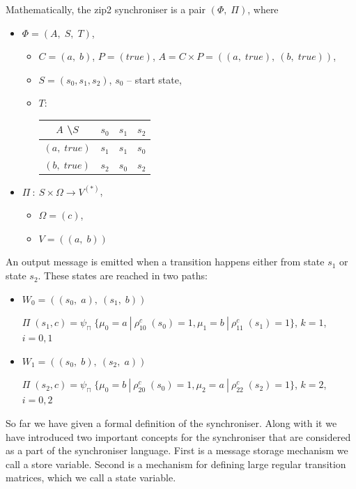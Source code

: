 \begin{enumerate}
Mathematically, the zip2 synchroniser is a pair $(\Phi, \; \Pi)$, where
  \begin{itemize}
  \item[] $\Phi = (A, \; S, \; T)$,
    \begin{itemize}
    \item[] $C = (a, \; b)$, $P = (true)$, $A = C \times P = ((a, \; true), \: (b, \; true))$,
    \item[] $S = (s_{0}, s_{1}, s_{2})$, $s_{0}$ -- start state,
    \item[] $T$:
      \begin{tabular}{c|c|c|c}
      $A$ \textbackslash $S$ & $s_{0}$ & $s_{1}$ & $s_{2}$\\
      \hline
      $(a, \; true)$ & $s_{1}$ & $s_{1}$ & $s_{0}$\\
      \hline
      $(b, \; true)$ & $s_{2}$ & $s_{0}$ & $s_{2}$\\
      \end{tabular}
    \end{itemize}
  \item[] $\Pi \: : \: S \times \Omega \to V^{(*)}$,
    \begin{itemize}
    \item[] $\Omega = (c)$,
    \item[] $V = ((a, \; b))$
    \end{itemize}
  \end{itemize}

An output message is emitted when a transition happens either from state $s_{1}$ or state $s_{2}$. These states are reached in two paths:
  \begin{itemize}
  \item[]
$W_{0} = ((s_{0}, \; a), \: (s_{1}, \; b))$

$\Pi \; (s_{1}, c) = \psi_{\sqcap} \; \{\mu_{0} = a \: | \: \rho_{10}^{c} \; (s_{0}) = 1, \mu_{1} = b \: | \: \rho_{11}^{c} \; (s_{1}) = 1\}$, $k = 1$, $i = 0,1$
  \item[]
$W_{1} = ((s_{0}, \; b), \: (s_{2}, \; a))$

$\Pi \; (s_{2}, c) = \psi_{\sqcap} \; \{\mu_{0} = b \: | \: \rho_{20}^{c} \; (s_{0}) = 1, \mu_{2} = a \: | \: \rho_{22}^{c} \; (s_{2}) = 1\}$, $k = 2$, $i = 0,2$ 
  \end{itemize}
  \end{enumerate}

So far we have given a formal definition of the synchroniser. Along with it we have introduced two important concepts for the synchroniser that are considered as a part of the synchroniser language. First is a message storage mechanism we call a store variable. Second is a mechanism for defining large regular transition matrices, which we call a state variable.


